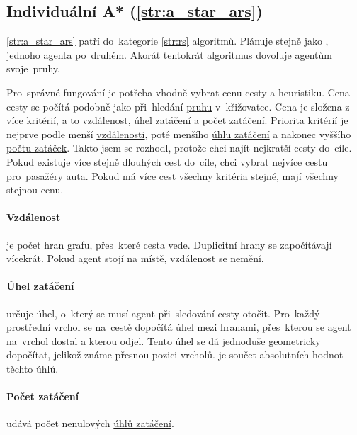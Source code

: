 \subsection{Individuální A* (\ref{str:a_star_ars})}\label{subsec:individualni_a_star}


\ref{str:a_star_ars} patří do~kategorie \ref{str:rs} algoritmů.
Plánuje stejně jako , jednoho agenta po~druhém.
Akorát tentokrát algoritmus dovoluje agentům  svoje~pruhy.

Pro~správné fungování  je potřeba vhodně vybrat cenu cesty a heuristiku.
Cena cesty se počítá podobně jako při~hledání \hyperref[par:pruh]{pruhu} v~křižovatce.
Cena je složena z více kritérií, a to \hyperref[par:ars_vzdalenost]{vzdálenost},
\hyperref[par:ars_uhel_zataceni]{úhel zatáčení} a \hyperref[par:ars_pocet_zataceni]{počet zatáčení}.
Priorita kritérií je nejprve podle menší \hyperref[par:ars_vzdalenost]{vzdálenosti},
poté menšího \hyperref[par:ars_uhel_zataceni]{úhlu zatáčení}
a nakonec vyššího \hyperref[par:ars_pocet_zataceni]{počtu zatáček}.
Takto jsem se rozhodl, protože chci najít nejkratší cesty do~cíle.
Pokud existuje více stejně dlouhých cest do~cíle, chci vybrat nejvíce  cestu pro~pasažéry auta.
Pokud má více cest všechny kritéria stejné, mají všechny stejnou cenu.

\paragraph{Vzdálenost}\label{par:ars_vzdalenost} je počet hran grafu, přes~které cesta vede.
Duplicitní hrany se započítávají vícekrát.
Pokud agent stojí na místě, vzdálenost se nemění.

\paragraph{Úhel zatáčení}\label{par:ars_uhel_zataceni} určuje úhel, o~který se musí agent při~sledování cesty otočit.
Pro~každý prostřední vrchol se na~cestě dopočítá úhel mezi hranami,
přes~kterou se agent na~vrchol dostal a kterou odjel.
Tento úhel se dá jednoduše geometricky dopočítat, jelikož známe přesnou pozici vrcholů.
 je součet absolutních hodnot těchto úhlů.

\paragraph{Počet zatáčení}\label{par:ars_pocet_zataceni} udává počet
nenulových \hyperref[par:ars_uhel_zataceni]{úhlů zatáčení}.

